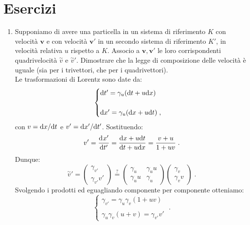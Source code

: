 \section{Esercizi}
\begin{enumerate}
\item Supponiamo di avere una particella in un sistema di riferimento $K$ con velocità $\mathbf{v}$ e con velocità $\mathbf{v}'$ in un secondo sistema di riferimento $K'$, in velocità relativa $u$ rispetto a $K$. Associo a $\mathbf{v},\mathbf{v}'$ le loro corrispondenti quadrivelocità $\stackrel{\sim}{v}$ e $\stackrel{\sim}{v}'$. Dimostrare che la legge di composizione delle velocità è uguale (sia per i trivettori, che per i quadrivettori). \\

Le trasformazioni di Lorentz sono date da:
\begin{equation}
 \begin{cases}
  \mathrm{d}{t'}=\gamma_u(\mathrm{d}{t}+u\mathrm{d}{x}) \\
\\
\mathrm{d}{x'}=\gamma_u(\mathrm{d}{x}+u\mathrm{d}{t})\;,
 \end{cases}
\end{equation}
con $v=\mathrm{d}{x}/\mathrm{d}{t}$ e $v'=\mathrm{d}{x'}/\mathrm{d}{t'}$. Sostituendo:
\begin{equation}
v'=\frac{\mathrm{d}^{}x'}{\mathrm{d}t'^{}}=\frac{\mathrm{d}{x}+u\mathrm{d}{t}}{\mathrm{d}{t}+u\mathrm{d}{x}}=\frac{v+u}{1+uv}\;.
\end{equation}
Dunque:
\begin{equation}
\stackrel{\sim}{v}'=\begin{pmatrix}
\gamma_{v'} \\
\gamma_{v'}v'
\end{pmatrix}\stackrel{?}{=}\begin{pmatrix}
\gamma_u & \gamma_uu	 \\
\gamma_uu & \gamma_u
\end{pmatrix}\begin{pmatrix}
\gamma_v \\
\gamma_vv
\end{pmatrix}\;.
\end{equation}
Svolgendo i prodotti ed eguagliando componente per componente otteniamo:
\begin{equation}
\begin{cases}
\gamma_{v'}=\gamma_u\gamma_v(1+uv) \\
\\
\gamma_u\gamma_v(u+v)=\gamma_{v'}v'
\end{cases}\;.
\end{equation}

\end{enumerate}
